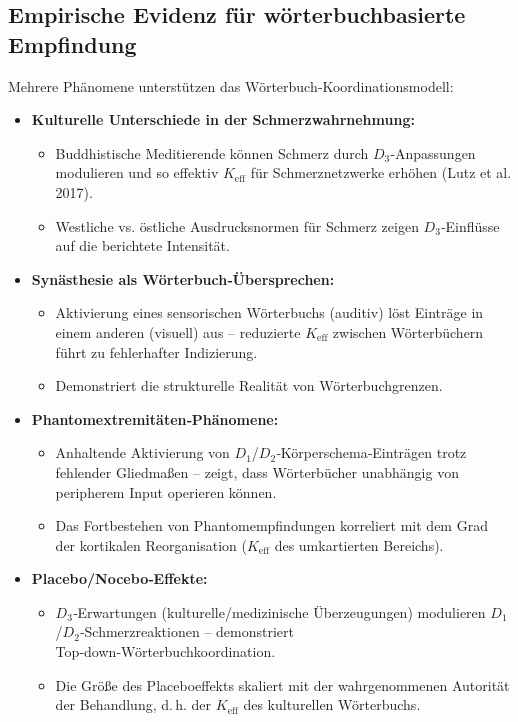 \documentclass[12pt,a4paper]{article}
\newcommand{\eff}{\mathrm{eff}}
\newcommand{\Ke}{K_{\eff}}
\begin{document}
	\subsection{Empirische Evidenz für wörterbuchbasierte Empfindung}
	
	Mehrere Phänomene unterstützen das Wörterbuch‑Koordinationsmodell:
	
	\begin{itemize}
		\item \textbf{Kulturelle Unterschiede in der Schmerzwahrnehmung:}
		\begin{itemize}
			\item Buddhistische Meditierende können Schmerz durch $D_3$‑Anpassungen modulieren und so effektiv $\Ke$ für Schmerznetzwerke erhöhen (Lutz et al. 2017).
			\item Westliche vs. östliche Ausdrucksnormen für Schmerz zeigen $D_3$‑Einflüsse auf die berichtete Intensität.
		\end{itemize}
		
		\item \textbf{Synästhesie als Wörterbuch‑Übersprechen:}
		\begin{itemize}
			\item Aktivierung eines sensorischen Wörterbuchs (auditiv) löst Einträge in einem anderen (visuell) aus – reduzierte $\Ke$ zwischen Wörterbüchern führt zu fehlerhafter Indizierung.
			\item Demonstriert die strukturelle Realität von Wörterbuchgrenzen.
		\end{itemize}
		
		\item \textbf{Phantomextremitäten‑Phänomene:}
		\begin{itemize}
			\item Anhaltende Aktivierung von $D_1$/$D_2$‑Körperschema‑Einträgen trotz fehlender Gliedmaßen – zeigt, dass Wörterbücher unabhängig von peripherem Input operieren können.
			\item Das Fortbestehen von Phantomempfindungen korreliert mit dem Grad der kortikalen Reorganisation ($\Ke$ des umkartierten Bereichs).
		\end{itemize}
		
		\item \textbf{Placebo/Nocebo‑Effekte:}
		\begin{itemize}
			\item $D_3$‑Erwartungen (kulturelle/medizinische Überzeugungen) modulieren $D_1$/$D_2$‑Schmerzreaktionen – demonstriert Top‑down‑Wörterbuchkoordination.
			\item Die Größe des Placeboeffekts skaliert mit der wahrgenommenen Autorität der Behandlung, d. h. der $\Ke$ des kulturellen Wörterbuchs.
		\end{itemize}
	\end{itemize}
	
\end{document}
